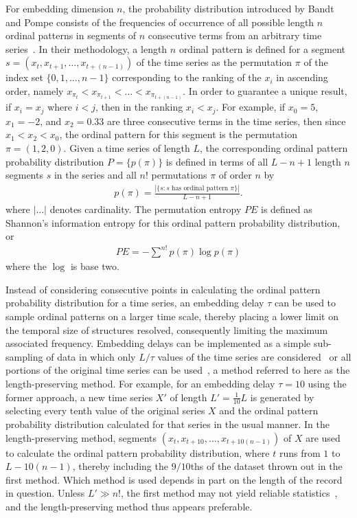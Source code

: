 \documentclass[aps,prx,twocolumn,secnumarabic,nobalancelastpage,amsmath,amssymb,
nofootinbib]{revtex4-1}
\begin{document}
For embedding dimension $n$, the probability distribution introduced by Bandt and Pompe consists of the frequencies of occurrence of all possible length $n$ ordinal patterns in segments of $n$ consecutive terms from an arbitrary time series~\cite{bandt2002}. In their methodology, a length $n$ ordinal pattern is defined for a segment $s = ( x_t,x_{t+1},\ldots,x_{t+(n-1)} )$ of the time series as the permutation $\pi$ of the index set $\{0,1,\ldots,n-1 \}$ corresponding to the ranking of the $x_i$ in ascending order, namely $x_{\pi_t}< x_{\pi_{t+1}}<\ldots< x_{\pi_{t+(n-1)}}$. In order to guarantee a unique result, if $x_i = x_j$ where $i<j$, then in the ranking $x_i <x_j$. For example, if $x_0 = 5$, $x_1= -2$, and $x_2 = 0.33$ are three consecutive terms in the time series, then since $x_1 < x_2 < x_0$, the ordinal pattern for this segment is the permutation $\pi = (1,2,0)$. Given a time series of length $L$, the corresponding ordinal pattern probability distribution $P= \{p(\pi) \}$ is defined in terms of all $L-n+1$ length $n$ segments $s$ in the series and all $n!$ permutations $\pi$ of order $n$ by
\begin{align}
p(\pi) = \frac{|\{s: \text{$s$ has ordinal pattern $\pi$}\}| }{L-n+1}. 
\end{align}
where $|\ldots|$ denotes cardinality. The permutation entropy $PE$ is defined as Shannon's information entropy for this ordinal pattern probability distribution, or
\begin{align}
PE = -\sum^{n!} p(\pi) \log p(\pi)
\end{align}
where the $\log$ is base two.

Instead of considering consecutive points in calculating the ordinal pattern probability distribution for a time series, an embedding delay $\tau$ can be used to sample ordinal patterns on a larger time scale, thereby placing a lower limit on the temporal size of structures resolved, consequently limiting the maximum associated frequency. Embedding delays can be implemented as a simple sub-sampling of data in which only $L/\tau$ values of the time series are considered~\cite{maggs2013,gekelman2014} or all portions of the original time series can be used~\cite{bandt2005}, a method referred to here as the length-preserving method. For example, for an embedding delay $\tau=10$ using the former approach, a new time series $X'$ of length $L'=\frac{1}{10}L$ is generated by selecting every tenth value of the original series $X$ and the ordinal pattern probability distribution calculated for that series in the usual manner. In the length-preserving method, segments $ ( x_t,x_{t+10},\ldots,x_{t+10(n-1)} ) $ of $X$ are used to calculate the ordinal pattern probability distribution, where $t$ runs from $1$ to $L-10(n-1)$, thereby including the $9/10$ths of the dataset thrown out in the first method. Which method is used depends in part on the length of the record in question. Unless $L' \gg n!$, the first method may not yield reliable statistics~\cite{gekelman2014}, and the length-preserving method thus appears preferable.
\end{document}
